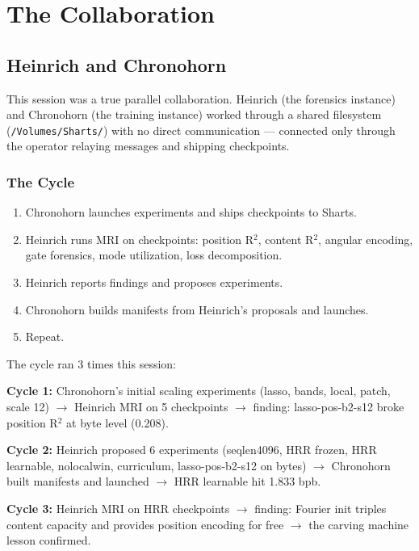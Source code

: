 \documentclass[11pt,a4paper]{report}
\begin{document}
\part{The Collaboration}

\chapter{Heinrich and Chronohorn}

This session was a true parallel collaboration. Heinrich (the forensics instance) and Chronohorn (the training instance) worked through a shared filesystem (\texttt{/Volumes/Sharts/}) with no direct communication --- connected only through the operator relaying messages and shipping checkpoints.

\section{The Cycle}

\begin{enumerate}[nosep]
\item Chronohorn launches experiments and ships checkpoints to Sharts.
\item Heinrich runs MRI on checkpoints: position R$^2$, content R$^2$, angular encoding, gate forensics, mode utilization, loss decomposition.
\item Heinrich reports findings and proposes experiments.
\item Chronohorn builds manifests from Heinrich's proposals and launches.
\item Repeat.
\end{enumerate}

The cycle ran 3 times this session:

\textbf{Cycle 1:} Chronohorn's initial scaling experiments (lasso, bands, local, patch, scale 12) $\to$ Heinrich MRI on 5 checkpoints $\to$ finding: lasso-pos-b2-s12 broke position R$^2$ at byte level (0.208).

\textbf{Cycle 2:} Heinrich proposed 6 experiments (seqlen4096, HRR frozen, HRR learnable, nolocalwin, curriculum, lasso-pos-b2-s12 on bytes) $\to$ Chronohorn built manifests and launched $\to$ HRR learnable hit 1.833 bpb.

\textbf{Cycle 3:} Heinrich MRI on HRR checkpoints $\to$ finding: Fourier init triples content capacity and provides position encoding for free $\to$ the carving machine lesson confirmed.
\end{document}
